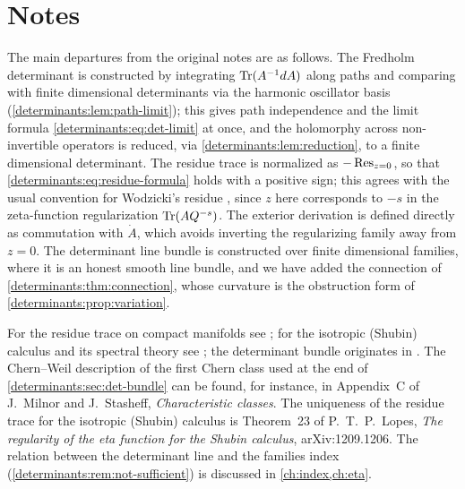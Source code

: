 \section*{Notes}

The main departures from the original notes are as follows. The Fredholm
determinant is constructed by integrating $\operatorname{Tr}(A^{-1}dA)$ along paths and
comparing with finite dimensional determinants via the harmonic oscillator
basis (\cref{determinants:lem:path-limit}); this gives path independence and
the limit formula \eqref{determinants:eq:det-limit} at once, and the
holomorphy across non-invertible operators is reduced, via
\cref{determinants:lem:reduction}, to a finite dimensional determinant. The
residue trace is normalized as $-\operatorname{Res}_{z=0}$, so that
\eqref{determinants:eq:residue-formula} holds with a positive sign; this agrees
with the usual convention for Wodzicki's residue \cite{Wodzicki-residue},
since $z$ here corresponds to $-s$ in the zeta-function regularization
$\operatorname{Tr}(AQ^{-s})$. The exterior derivation is defined directly as commutation
with $\dot A$, which avoids inverting the regularizing family away from $z=0$.
The determinant line bundle is constructed over finite dimensional families,
where it is an honest smooth line bundle, and we have added the connection of
\cref{determinants:thm:connection}, whose curvature is the obstruction form of
\cref{determinants:prop:variation}.

For the residue trace on compact manifolds see
\cite{Wodzicki-residue,Guillemin-residue}; for the isotropic (Shubin) calculus
and its spectral theory see \cite{Shubin}; the determinant bundle originates in
\cite{Quillen}. The Chern--Weil description of the first Chern class used at
the end of \cref{determinants:sec:det-bundle} can be found, for instance, in
Appendix~C of J.~Milnor and J.~Stasheff, \emph{Characteristic classes}.
The uniqueness of the residue trace for the isotropic (Shubin) calculus is
Theorem~23 of P.~T.~P.~Lopes, \emph{The regularity of the eta function for the
Shubin calculus}, arXiv:1209.1206. The relation between the determinant line
and the families index (\cref{determinants:rem:not-sufficient}) is discussed
in \cref{ch:index,ch:eta}.
